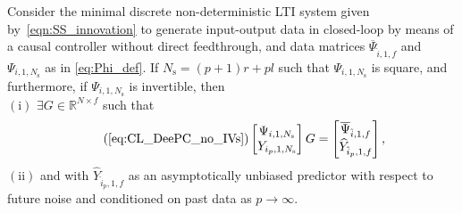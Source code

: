 \begin{thm}\label{theorem:main_result}
    Consider the minimal discrete non-deterministic \ac{LTI} system given by~\eqref{eqn:SS_innovation} to generate input-output data in closed-loop by means of a causal controller without direct feedthrough, and data matrices $\overline{\Psi}_{\hat{i},1,f}$ and $\Psi_{i,1,N_\mathrm{s}}$ as in \eqref{eq:Phi_def}. If $N_\mathrm{s}=(p+1)r+pl$ such that $\Psi_{i,1,N_\mathrm{s}}$ is square, and furthermore, if $\Psi_{i,1,N_\mathrm{s}}$ is invertible, %
    then \\
    $\mathrm{(i)}$ $\exists G\in\mathbb{R}^{N\times f}$ such that
    \begin{align}\tag{\ref{eq:CL_DeePC_no_IVs}}%
        \begin{bmatrix}
            \Psi_{i,1,N_\mathrm{s}}\\
            Y_{i_p,1,N_\mathrm{s}}
        \end{bmatrix}G =
        \begin{bmatrix}
            \overline{\Psi}_{\hat{i},1,f}\\
            \widehat{Y}_{\hat{i}_p,1,f}
        \end{bmatrix},
    \end{align}
    $\mathrm{(ii)}$ and with $\widehat{Y}_{\hat{i}_p,1,f}$ as an asymptotically unbiased predictor %
    with respect to future noise and conditioned on past data as $p\rightarrow\infty$.%
\end{thm}

